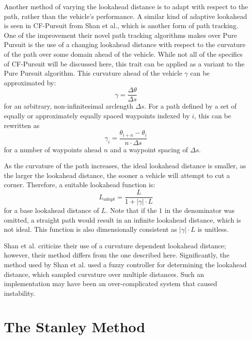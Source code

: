 \documentclass[mla7]{mla}
\begin{document}
\begin{paper}
Another method of varying the lookahead distance is to adapt with respect to the path, rather than the vehicle's performance. A similar kind of adaptive lookahead is seen in CF-Pursuit from Shan et al., which is another form of path tracking. One of the improvement their novel path tracking algorithms makes over Pure Pursuit is the use of a changing lookahead distance with respect to the curvature of the path over some domain ahead of the vehicle. While not all of the specifics of CF-Pursuit will be discussed here, this trait can be applied as a variant to the Pure Pursuit algorithm. This curvature ahead of the vehicle $\gamma$ can be approximated by: 
\begin{equation*}
\gamma = \frac{\Delta\theta}{\Delta s}
\end{equation*}
for an arbitrary, non-infinitesimal arclength $\Delta s$. For a path defined by a set of equally or approximately equally spaced waypoints indexed by $i$, this can be rewritten as
\begin{equation}
\gamma_i = \frac{\theta_{i+n}-\theta_i}{n \cdot \Delta s}
\end{equation}
for a number of waypoints ahead $n$ and a waypoint spacing of $\Delta s$.

As the curvature of the path increases, the ideal lookahead distance is smaller, as the larger the lookahead distance, the sooner a vehicle will attempt to cut a corner. Therefore, a suitable lookahead function is:
\begin{equation}
L_{adapt} = \frac{L}{1+|\gamma| \cdot L}
\end{equation}
for a base lookahead distance of $L$. Note that if the $1$ in the denominator was omitted, a straight path would result in an infinite lookahead distance, which is not ideal. This function is also dimensionally consistent as $|\gamma| \cdot L$ is unitless.

Shan et al. criticize their use of a curvature dependent lookahead distance; however, their method differs from the one described here. Significantly, the method used by Shan et al. used a fuzzy controller for determining the lookahead distance, which sampled curvature over multiple distances. Such an implementation may have been an over-complicated system that caused instability.


\section{The Stanley Method}


\end{paper}
\end{document}
